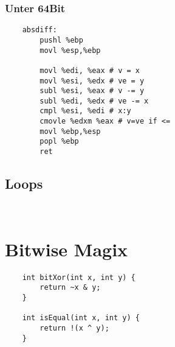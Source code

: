 \documentclass[a4paper, 11pt]{article}
\begin{document}
\subsubsection{Unter 64Bit}
\begin{lstlisting}
	absdiff:
		pushl %ebp
		movl %esp,%ebp
		
		movl %edi, %eax	# v = x
		movl %esi, %edx	# ve = y
		subl %esi, %eax # v -= y
		subl %edi, %edx # ve -= x
		cmpl %esi, %edi # x:y
		cmovle %edxm %eax # v=ve if <=
		movl %ebp,%esp
		popl %ebp
		ret
\end{lstlisting}

\subsection{Loops}
\begin{lstlisting}
	
\end{lstlisting}

\section{Bitwise Magix}
\begin{lstlisting}
	int bitXor(int x, int y) {
		return ~x & y;
	}
	
	int isEqual(int x, int y) {
		return !(x ^ y);
	}
\end{lstlisting}
\end{document}

